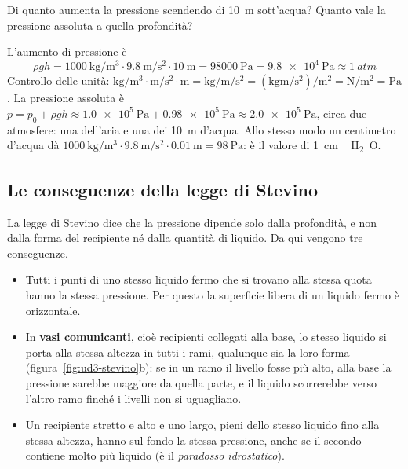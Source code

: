 \begin{esempio}
Di quanto aumenta la pressione scendendo di \SI{10}{\metre} sott'acqua? Quanto vale la pressione assoluta a quella profondità?

L'aumento di pressione è
\[
  \rho g h = \SI{1000}{\kilo\gram\per\metre\cubed} \cdot \SI{9,8}{\metre\per\second\squared} \cdot \SI{10}{\metre} = \SI{98000}{\pascal} = \SI{9,8e4}{\pascal} \approx \SI{1}{atm}
\]
Controllo delle unità: $\si{\kilo\gram\per\metre\cubed} \cdot \si{\metre\per\second\squared} \cdot \si{\metre} = \si{\kilo\gram\per\metre\per\second\squared} = (\si{\kilo\gram\metre\per\second\squared})/\si{\metre\squared} = \si{\newton\per\metre\squared} = \si{\pascal}$. La pressione assoluta è $p = p_0 + \rho g h \approx \SI{1,0e5}{\pascal} + \SI{0,98e5}{\pascal} \approx \SI{2,0e5}{\pascal}$, circa due atmosfere: una dell'aria e una dei \SI{10}{\metre} d'acqua. Allo stesso modo un centimetro d'acqua dà $\SI{1000}{\kilo\gram\per\metre\cubed} \cdot \SI{9,8}{\metre\per\second\squared} \cdot \SI{0,01}{\metre} = \SI{98}{\pascal}$: è il valore di \SI{1}{cm\,H_2O}.
\end{esempio}



\subsection{Le conseguenze della legge di Stevino}

La legge di Stevino dice che la pressione dipende solo dalla profondità, e non dalla forma del recipiente né dalla quantità di liquido. Da qui vengono tre conseguenze.
\begin{itemize}
  \item Tutti i punti di uno stesso liquido fermo che si trovano alla stessa quota hanno la stessa pressione. Per questo la superficie libera di un liquido fermo è orizzontale.
  \item In \textbf{vasi comunicanti}, cioè recipienti collegati alla base, lo stesso liquido si porta alla stessa altezza in tutti i rami, qualunque sia la loro forma (figura~\ref{fig:ud3-stevino}b): se in un ramo il livello fosse più alto, alla base la pressione sarebbe maggiore da quella parte, e il liquido scorrerebbe verso l'altro ramo finché i livelli non si uguagliano.
  \item Un recipiente stretto e alto e uno largo, pieni dello stesso liquido fino alla stessa altezza, hanno sul fondo la stessa pressione, anche se il secondo contiene molto più liquido (è il \emph{paradosso idrostatico}).
\end{itemize}

